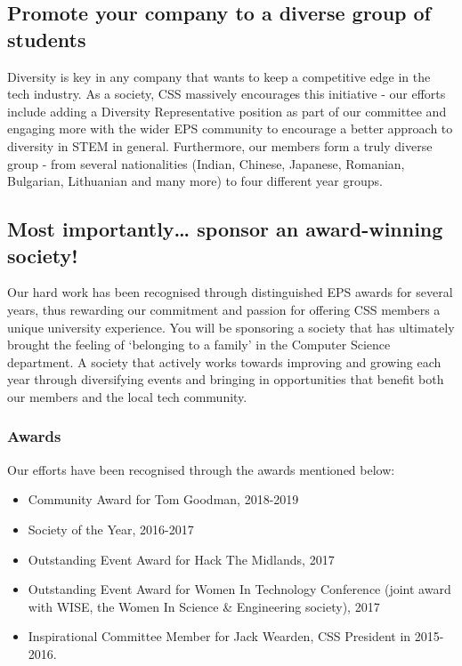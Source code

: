 \documentclass{article}
\begin{document}
\subsection*{Promote your company to a diverse group of students}

Diversity is key in any company that wants to keep a competitive edge in the tech industry. As a society, CSS massively encourages this initiative - our efforts include adding a Diversity Representative position as part of our committee and engaging more with the wider EPS community to encourage a better approach to diversity in STEM in general.
Furthermore, our members form a truly diverse group - from several nationalities (Indian, Chinese, Japanese, Romanian, Bulgarian, Lithuanian and many more) to four different year groups.

\subsection*{Most importantly… sponsor an award-winning society!}

Our hard work has been recognised through distinguished EPS awards for several years, thus rewarding our commitment and passion for offering CSS members a unique university experience. 
You will be sponsoring a society that has ultimately brought the feeling of ‘belonging to a family’ in the Computer Science department.
A society that actively works towards improving and growing each year through diversifying events and bringing in opportunities that benefit both our members and the local tech community.

\newpage

\subsubsection*{Awards}

\noindent Our efforts have been recognised through the awards mentioned below:

\begin{itemize}
  \item Community Award for Tom Goodman, 2018-2019
  \item Society of the Year, 2016-2017
  \item Outstanding Event Award for Hack The Midlands, 2017
  \item Outstanding Event Award for Women In Technology Conference (joint award with WISE, the Women In Science \& Engineering society), 2017
  \item Inspirational Committee Member for Jack Wearden, CSS President in 2015-2016.
\end{itemize}
\end{document}
